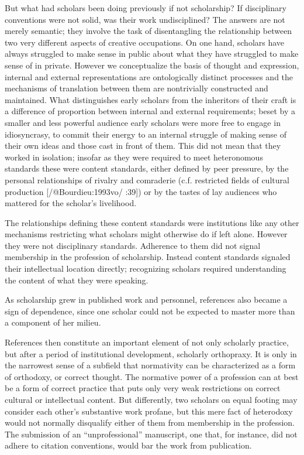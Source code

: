 \documentclass[]{article}
\begin{document}
But what had scholars been doing previously if not scholarship? If
disciplinary conventions were not solid, was their work undisciplined?
The answers are not merely semantic; they involve the task of
disentangling the relationship between two very different aspects of
creative occupations. On one hand, scholars have always struggled to
make sense in public about what they have struggled to make sense of in
private. However we conceptualize the basis of thought and expression,
internal and external representations are ontologically distinct
processes and the mechanisms of translation between them are
nontrivially constructed and maintained. What distinguishes early
scholars from the inheritors of their craft is a difference of
proportion between internal and external requirements; beset by a
smaller and less powerful audience early scholars were more free to
engage in idiosyncrasy, to commit their energy to an internal struggle
of making sense of their own ideas and those cast in front of them. This
did not mean that they worked in isolation; insofar as they were
required to meet heteronomous standards these were content standards,
either defined by peer pressure, by the personal relationships of
rivalry and comraderie (c.f. restricted fields of cultural production
{[}/@Bourdieu:1993vo/ :39{]}) or by the tastes of lay audiences who
mattered for the scholar's livelihood.

The relationships defining these content standards were institutions
like any other mechanisms restricting what scholars might otherwise do
if left alone. However they were not disciplinary standards. Adherence
to them did not signal membership in the profession of scholarship.
Instead content standards signaled their intellectual location directly;
recognizing scholars required understanding the content of what they
were speaking.

As scholarship grew in published work and personnel, references also
became a sign of dependence, since one scholar could not be expected to
master more than a component of her milieu.

References then constitute an important element of not only scholarly
practice, but after a period of institutional development, scholarly
orthopraxy. It is only in the narrowest sense of a subfield that
normativity can be characterized as a form of orthodoxy, or correct
thought. The normative power of a profession can at best be a form of
correct practice that puts only very weak restrictions on correct
cultural or intellectual content. But differently, two scholars on equal
footing may consider each other's substantive work profane, but this
mere fact of heterodoxy would not normally disqualify either of them
from membership in the profession. The submission of an
``unprofessional'' manuscript, one that, for instance, did not adhere to
citation conventions, would bar the work from publication.
\end{document}

